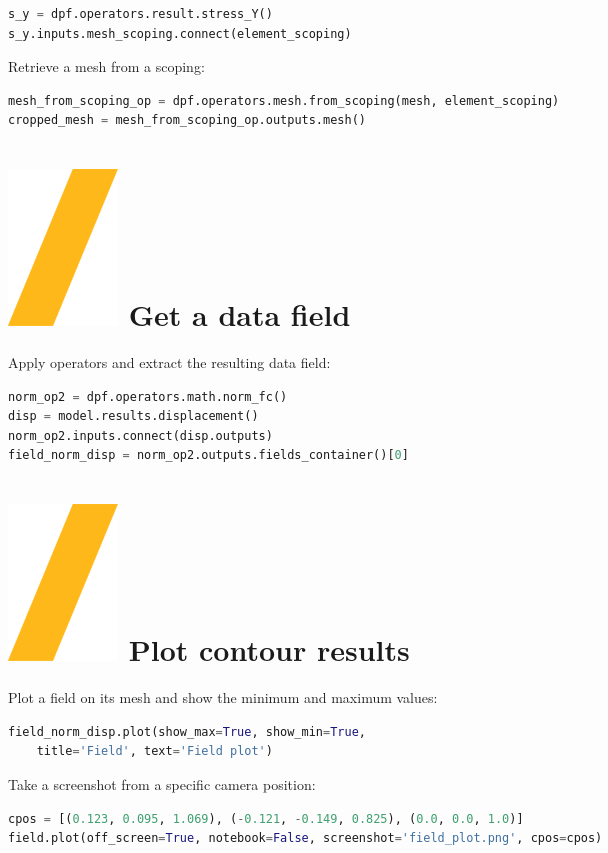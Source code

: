 \documentclass[9pt,landscape]{article}
\begin{document}
\begin{multicols}{3}
\begin{lstlisting}[language=Python]
s_y = dpf.operators.result.stress_Y()
s_y.inputs.mesh_scoping.connect(element_scoping)
\end{lstlisting}

Retrieve a mesh from a scoping:
\begin{lstlisting}[language=Python]
mesh_from_scoping_op = dpf.operators.mesh.from_scoping(mesh, element_scoping)
cropped_mesh = mesh_from_scoping_op.outputs.mesh()
\end{lstlisting}


\section{\includegraphics[height=\fontcharht\font`\S]{slash.png} Get a data field}
Apply operators and extract the resulting data field:
\begin{lstlisting}[language=Python]
norm_op2 = dpf.operators.math.norm_fc()
disp = model.results.displacement()
norm_op2.inputs.connect(disp.outputs)
field_norm_disp = norm_op2.outputs.fields_container()[0]
\end{lstlisting}

\vfill
\columnbreak

\section{\includegraphics[height=\fontcharht\font`\S]{slash.png} Plot contour results}
Plot a field on its mesh and show the minimum and maximum values:
\begin{lstlisting}[language=Python]
field_norm_disp.plot(show_max=True, show_min=True,
    title='Field', text='Field plot')
\end{lstlisting}
Take a screenshot from a specific camera position:
\begin{lstlisting}[language=Python]
cpos = [(0.123, 0.095, 1.069), (-0.121, -0.149, 0.825), (0.0, 0.0, 1.0)]
field.plot(off_screen=True, notebook=False, screenshot='field_plot.png', cpos=cpos)
\end{lstlisting}


\end{multicols}
\end{document}
